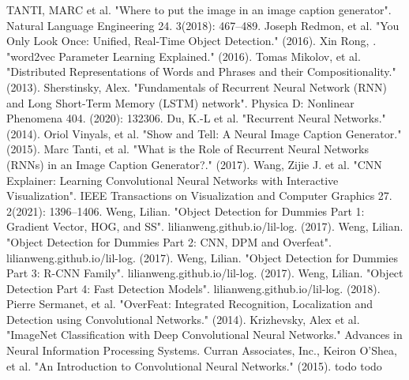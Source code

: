 \begin{thebibliography}{}
 TANTI, MARC et al. "Where to put the image in an image caption generator". Natural Language Engineering 24. 3(2018): 467–489.
Joseph Redmon, et al. "You Only Look Once: Unified, Real-Time Object Detection." (2016).
Xin Rong, . "word2vec Parameter Learning Explained." (2016).
Tomas Mikolov, et al. "Distributed Representations of Words and Phrases and their Compositionality." (2013).
Sherstinsky, Alex. "Fundamentals of Recurrent Neural Network (RNN) and Long Short-Term Memory (LSTM) network". Physica D: Nonlinear Phenomena 404. (2020): 132306.
Du, K.-L et al. "Recurrent Neural Networks." (2014). 
Oriol Vinyals, et al. "Show and Tell: A Neural Image Caption Generator." (2015).
Marc Tanti, et al. "What is the Role of Recurrent Neural Networks (RNNs) in an Image Caption Generator?." (2017).
Wang, Zijie J. et al. "CNN Explainer: Learning Convolutional Neural Networks with Interactive Visualization". IEEE Transactions on Visualization and Computer Graphics 27. 2(2021): 1396–1406.
Weng, Lilian. "Object Detection for Dummies Part 1: Gradient Vector, HOG, and SS". lilianweng.github.io/lil-log. (2017).
Weng, Lilian. "Object Detection for Dummies Part 2: CNN, DPM and Overfeat". lilianweng.github.io/lil-log. (2017).
Weng, Lilian. "Object Detection for Dummies Part 3: R-CNN Family". lilianweng.github.io/lil-log. (2017).
Weng, Lilian. "Object Detection Part 4: Fast Detection Models". lilianweng.github.io/lil-log. (2018).
Pierre Sermanet, et al. "OverFeat: Integrated Recognition, Localization and Detection using Convolutional Networks." (2014).
Krizhevsky, Alex et al. "ImageNet Classification with Deep Convolutional Neural Networks." Advances in Neural Information Processing Systems. Curran Associates, Inc.,
Keiron O'Shea, et al. "An Introduction to Convolutional Neural Networks." (2015).
 todo
 todo
\end{thebibliography}

